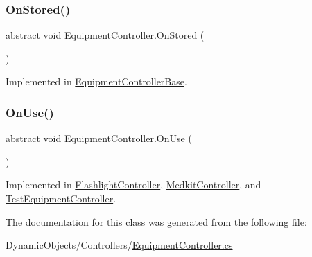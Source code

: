 \subsubsection{\texorpdfstring{On\+Stored()}{OnStored()}}
{\footnotesize\ttfamily abstract void Equipment\+Controller.\+On\+Stored (\begin{DoxyParamCaption}{ }\end{DoxyParamCaption})\hspace{0.3cm}{\ttfamily [pure virtual]}}



Implemented in \mbox{\hyperlink{class_equipment_controller_base_aa98a3869354632bcc5dfe5e9103ccaed}{Equipment\+Controller\+Base}}.

\mbox{\label{class_equipment_controller_ad15c45b6812eaefdaf26636ed8c45ab4}} 
\subsubsection{\texorpdfstring{On\+Use()}{OnUse()}}
{\footnotesize\ttfamily abstract void Equipment\+Controller.\+On\+Use (\begin{DoxyParamCaption}{ }\end{DoxyParamCaption})\hspace{0.3cm}{\ttfamily [pure virtual]}}



Implemented in \mbox{\hyperlink{class_flashlight_controller_aec521de4f68b86b7c48a9757119ed099}{Flashlight\+Controller}}, \mbox{\hyperlink{class_medkit_controller_a2958e0af81978b3a5c616ecdbeb520d3}{Medkit\+Controller}}, and \mbox{\hyperlink{class_test_equipment_controller_a41d31b42f5b120a11a0816568214455a}{Test\+Equipment\+Controller}}.



The documentation for this class was generated from the following file\+:\begin{DoxyCompactItemize}
\item 
Dynamic\+Objects/\+Controllers/\mbox{\hyperlink{_equipment_controller_8cs}{Equipment\+Controller.\+cs}}\end{DoxyCompactItemize}
